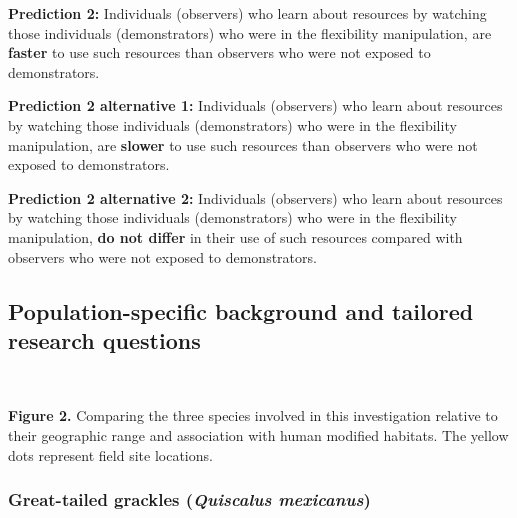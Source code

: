 \documentclass[
]{article}
\begin{document}
\textbf{Prediction 2:} Individuals (observers) who learn about resources
by watching those individuals (demonstrators) who were in the
flexibility manipulation, are \textbf{faster} to use such resources than
observers who were not exposed to demonstrators.

\textbf{Prediction 2 alternative 1:} Individuals (observers) who learn
about resources by watching those individuals (demonstrators) who were
in the flexibility manipulation, are \textbf{slower} to use such
resources than observers who were not exposed to demonstrators.

\textbf{Prediction 2 alternative 2:} Individuals (observers) who learn
about resources by watching those individuals (demonstrators) who were
in the flexibility manipulation, \textbf{do not differ} in their use of
such resources compared with observers who were not exposed to
demonstrators.

\hypertarget{population-specific-background-and-tailored-research-questions}{%
\subsection{Population-specific background and tailored research
questions}\label{population-specific-background-and-tailored-research-questions}}

~

\textbf{Figure 2.} Comparing the three species involved in this
investigation relative to their geographic range and association with
human modified habitats. The yellow dots represent field site locations.

\hypertarget{great-tailed-grackles-quiscalus-mexicanus}{%
\subsubsection{\texorpdfstring{Great-tailed grackles (\emph{Quiscalus
mexicanus})}{Great-tailed grackles (Quiscalus mexicanus)}}\label{great-tailed-grackles-quiscalus-mexicanus}}
\end{document}
